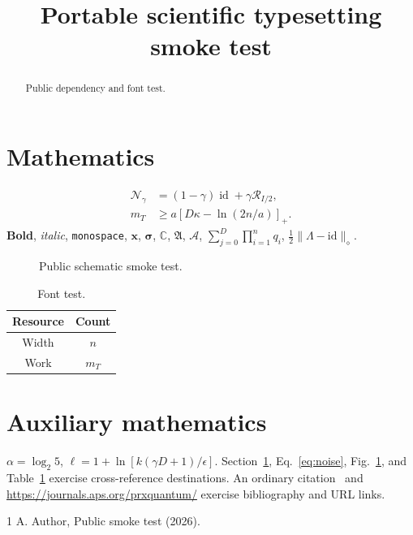 \documentclass[aps,prx,reprint,notitlepage,nofootinbib]{revtex4-2}
\begin{document}
\title{Portable scientific typesetting smoke test}
\date{}
\begin{abstract}Public dependency and font test.\end{abstract}
\maketitle
\section{Mathematics}\label{sec:math}
\begin{align}
\mathcal N_\gamma&=(1-\gamma)\operatorname{id}+\gamma\mathcal R_{I/2},\label{eq:noise}\\
m_T&\ge a\left[D\kappa-\ln(2n/a)\right]_+ .
\end{align}
\textbf{Bold}, \textit{italic}, \texttt{monospace},
$\mathbf{x}$, $\bm\sigma$, $\mathbb C$, $\mathfrak A$, $\mathscr A$,
$\sum_{j=0}^{D}\prod_{i=1}^{n}q_i$,
$\frac12\lVert\Lambda-\mathrm{id}\rVert_\diamond$.
\begin{figure}[ht]
\centering
{}
\caption{Public schematic smoke test.}\label{fig:smoke}
\end{figure}
\begin{table}[ht]\caption{Font test.}\label{tab:smoke}\begin{ruledtabular}
\begin{tabular}{cc}Resource&Count\\\hline Width&$n$\\Work&$m_T$\end{tabular}
\end{ruledtabular}\end{table}
\appendix\section{Auxiliary mathematics}
$\alpha=\log_2 5$, $\ell=1+\ln[k(\gamma D+1)/\epsilon]$.
Section~\ref{sec:math}, Eq.~\eqref{eq:noise}, Fig.~\ref{fig:smoke},
and Table~\ref{tab:smoke} exercise cross-reference destinations.
An ordinary citation~\cite{test} and \url{https://journals.aps.org/prxquantum/}
exercise bibliography and URL links.
\begin{thebibliography}{1}
A. Author, Public smoke test (2026).
\end{thebibliography}
\end{document}
